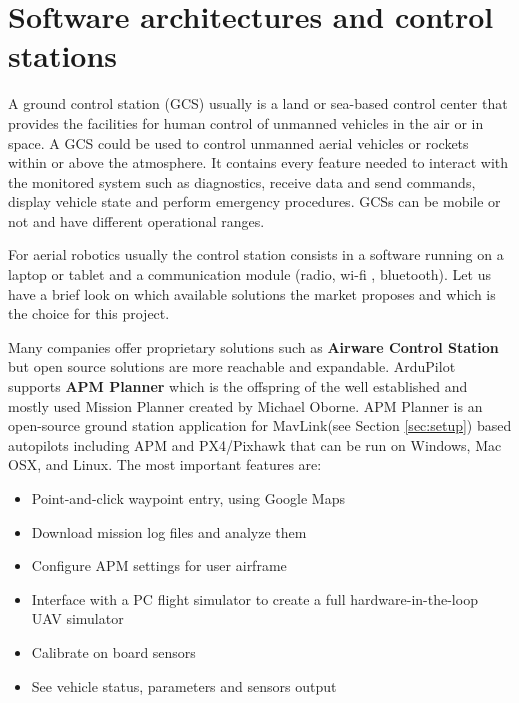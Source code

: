 \section{Software architectures and control stations}

A ground control station (GCS) usually is a land or sea-based control center that provides the facilities for human control of unmanned vehicles in the air or in space. A GCS could be used to control unmanned aerial vehicles or rockets within or above the atmosphere. It contains every feature needed to interact with the monitored system such as diagnostics, receive data and send commands, display vehicle state and perform emergency procedures. GCSs can be mobile or not and have different operational ranges. \par For aerial robotics usually the control station consists in a software running on a laptop or tablet and a communication module (radio, wi-fi , bluetooth). Let us have a brief look on which available solutions the market proposes and which is the choice for this project. \par 
Many companies offer proprietary solutions such as \textbf{Airware Control Station}  \cite{airware} but open source solutions are more reachable and expandable. ArduPilot supports \textbf{APM Planner} \cite{APMplan} which is the offspring of the well established and mostly used Mission Planner created by Michael Oborne. APM Planner is an open-source ground station application for MavLink(see Section \ref{sec:setup}) based autopilots including APM and PX4/Pixhawk that can be run on Windows, Mac OSX, and Linux. The most important features are: \begin{itemize}
\item Point-and-click waypoint entry, using Google Maps
\item Download mission log files and analyze them
\item Configure APM settings for user airframe
\item Interface with a PC flight simulator to create a full hardware-in-the-loop UAV simulator
\item Calibrate on board sensors
\item See vehicle status, parameters and sensors output

\end{itemize}
